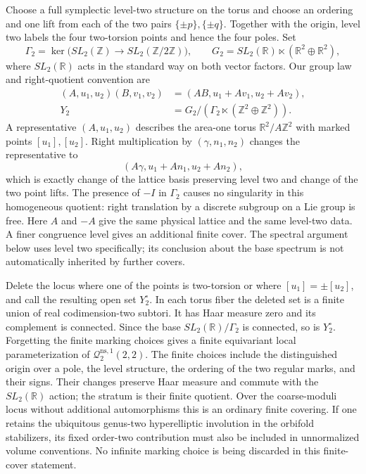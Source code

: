 \documentclass[11pt,a4paper]{article}
\numberwithin{equation}{section}
\theoremstyle{definition}
\theoremstyle{remark}
\newcommand{\RR}{\mathbb R}
\newcommand{\ZZ}{\mathbb Z}
\begin{document}
Choose a full symplectic level-two structure on the torus and
choose an ordering and one lift from each of the two pairs
$\{\pm p\},\{\pm q\}$.  Together with the origin, level two
labels the four two-torsion points and hence the four poles.  Set
\[
 \Gamma_2=\ker\bigl(SL_2(\ZZ)\to SL_2(\ZZ/2\ZZ)\bigr),
 \qquad
 G_2=SL_2(\RR)\ltimes(\RR^2\oplus\RR^2),
\]
where $SL_2(\RR)$ acts in the standard way on both vector factors.
Our group law and right-quotient convention are
\begin{align}
 (A,u_1,u_2)(B,v_1,v_2)
   &=(AB,u_1+Av_1,u_2+Av_2),\\
 Y_2&=G_2/(\Gamma_2\ltimes(\ZZ^2\oplus\ZZ^2)).
 \label{eq:genus2Y2}
\end{align}
A representative $(A,u_1,u_2)$ describes the area-one torus
$\RR^2/A\ZZ^2$ with marked points $[u_1],[u_2]$.
Right multiplication by $(\gamma,n_1,n_2)$ changes the
representative to
\[
 (A\gamma,u_1+An_1,u_2+An_2),
\]
which is exactly change of the lattice basis preserving level two
and change of the two point lifts.  The presence of $-I$ in
$\Gamma_2$ causes no singularity in this homogeneous quotient:
right translation by a discrete subgroup on a Lie group is free.
Here $A$ and $-A$ give the same physical lattice and the same
level-two data.  A finer congruence level gives an additional finite cover. The spectral
argument below uses level two specifically; its conclusion about the
base spectrum is not automatically inherited by further covers.

Delete the locus where one of the points is two-torsion or where
$[u_1]=\pm[u_2]$, and call the resulting open set $Y_2^\circ$.
In each torus fiber the deleted set is a finite union of real
codimension-two subtori.  It has Haar measure zero and its
complement is connected.  Since the base $SL_2(\RR)/\Gamma_2$ is
connected, so is $Y_2^\circ$.
Forgetting the finite marking choices gives a finite equivariant
local parameterization of $\mathcal Q^{\mathrm{ns},1}_2(2,2)$.
The finite choices include the distinguished origin over a pole,
the level structure, the ordering of the two regular marks, and
their signs.  Their changes preserve Haar measure and commute
with the $SL_2(\RR)$ action; the stratum is their finite quotient.
Over the coarse-moduli locus without additional automorphisms
this is an ordinary finite covering.  If one retains the
ubiquitous genus-two hyperelliptic involution in the orbifold
stabilizers, its fixed order-two contribution must also be
included in unnormalized volume conventions.  No infinite
marking choice is being discarded in this finite-cover statement.
\end{document}
